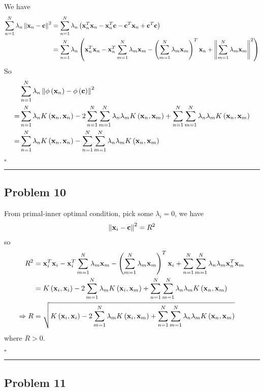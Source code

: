 \documentclass[12pt]{article}
\newcommand*{\QEDB}{\hfill\ensuremath{\square}}
\newcommand{\ParTh}[1]{\left(#1\right)}
\newcommand{\BF}[1]{{\bf#1}}
\newcommand{\VecAbsVal}[1]{\left\|#1\right\|}
\newcommand{\horrule}[1]{\rule{\linewidth}{#1}}
\begin{document}
We have
\begin{align}
\sum_{n=1}^{N}\lambda_n\VecAbsVal{\BF{x}_n-\BF{c}}^2&=\sum_{n=1}^{N}\lambda_n\ParTh{\BF{x}^T_n\BF{x}_n-\BF{x}^T_n\BF{c}-\BF{c}^T\BF{x}_n+\BF{c}^T\BF{c}}\\
&=\sum_{n=1}^{N}\lambda_n\ParTh{\BF{x}^T_n\BF{x}_n-\BF{x}^T_n\sum_{m=1}^{N}\lambda_m\BF{x}_m-\ParTh{\sum_{m=1}^{N}\lambda_m\BF{x}_m}^T\BF{x}_n+\VecAbsVal{\sum_{m=1}^{N}\lambda_m\BF{x}_m}^2}
\end{align}
So
\begin{align}
&\sum_{n=1}^{N}\lambda_n\VecAbsVal{\phi\ParTh{\BF{x}_n}-\phi\ParTh{\BF{c}}}^2\\
=&\sum_{n=1}^{N}\lambda_nK\ParTh{\BF{x}_n,\BF{x}_n}-2\sum_{n=1}^{N}\sum_{m=1}^{N}\lambda_n\lambda_mK\ParTh{\BF{x}_n,\BF{x}_m}+\sum_{n=1}^{N}\sum_{m=1}^{N}\lambda_n\lambda_mK\ParTh{\BF{x}_n,\BF{x}_m}\\
=&\sum_{n=1}^{N}\lambda_nK\ParTh{\BF{x}_n,\BF{x}_n}-\sum_{n=1}^{N}\sum_{m=1}^{N}\lambda_n\lambda_mK\ParTh{\BF{x}_n,\BF{x}_m}
\end{align}

\QEDB

\horrule{0.5pt}

\subsection*{Problem 10}

From primal-inner optimal condition, pick some $\lambda_i=0$, we have
\begin{align}
\VecAbsVal{\BF{x}_i-\BF{c}}^2=R^2
\end{align}
so
\begin{align}
R^2&=\BF{x}^T_i\BF{x}_i-\BF{x}^T_i\sum_{m=1}^{N}\lambda_m\BF{x}_m-\ParTh{\sum_{m=1}^{N}\lambda_m\BF{x}_m}^T\BF{x}_i+\sum_{n=1}^{N}\sum_{m=1}^{N}\lambda_n\lambda_m\BF{x}^T_n\BF{x}_m\\
&=K\ParTh{\BF{x}_i,\BF{x}_i}-2\sum_{m=1}^{N}\lambda_mK\ParTh{\BF{x}_i,\BF{x}_m}+\sum_{n=1}^{N}\sum_{m=1}^{N}\lambda_n\lambda_mK\ParTh{\BF{x}_n,\BF{x}_m}\\
\Rightarrow R&=\sqrt{K\ParTh{\BF{x}_i,\BF{x}_i}-2\sum_{m=1}^{N}\lambda_mK\ParTh{\BF{x}_i,\BF{x}_m}+\sum_{n=1}^{N}\sum_{m=1}^{N}\lambda_n\lambda_mK\ParTh{\BF{x}_n,\BF{x}_m}}
\end{align}
where $R>0$.

\QEDB

\horrule{0.5pt}

\subsection*{Problem 11}
\end{document}
